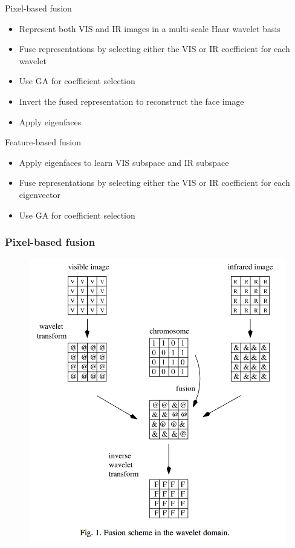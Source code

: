\documentclass{beamer}
\begin{document}
\begin{frame}
\begin{block}{Pixel-based fusion}
\begin{itemize}
\item Represent both VIS and IR images in a multi-scale Haar wavelet basis
\item Fuse representations by selecting either the VIS or IR coefficient for each wavelet
\item Use GA for coefficient selection
\item Invert the fused representation to reconstruct the face image
\item Apply eigenfaces 
\end{itemize}
\end{block}
\pause
\begin{block}{Feature-based fusion}
\begin{itemize}
\item Apply eigenfaces to learn VIS subspace and IR subspace
\item Fuse representations by selecting either the VIS or IR coefficient for each eigenvector
\item Use GA for coefficient selection
\end{itemize}
\end{block}
\end{frame}

\begin{frame}
\frametitle{Pixel-based fusion}
\begin{figure}
\includegraphics[height=0.8\textheight]{pixelfusion}
\end{figure}
\end{frame}
\end{document}
